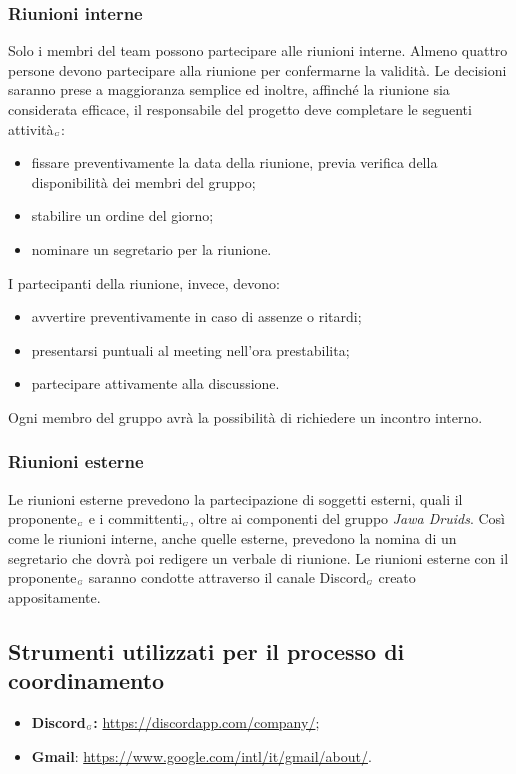 \subsubsection{Riunioni interne}\label{ProcessiOrganizzativiProcessoDiCoordinamentoRiunioniRiunioniInterne}
Solo i membri del team possono partecipare alle riunioni interne. Almeno quattro persone devono partecipare alla riunione per confermarne la validità. Le decisioni saranno prese a maggioranza semplice ed inoltre, affinché la riunione sia considerata efficace, il responsabile del progetto deve completare le seguenti attività$_{\scaleto{G}{3pt}}$:
\begin{itemize}
\item fissare preventivamente la data della riunione, previa verifica della disponibilità dei membri del gruppo;
\item stabilire un ordine del giorno;
\item nominare un segretario per la riunione.
\end{itemize}
I partecipanti della riunione, invece, devono:
\begin{itemize}
	\item avvertire preventivamente in caso di assenze o ritardi;
	\item presentarsi puntuali al meeting nell'ora prestabilita;
	\item partecipare attivamente alla discussione.
\end{itemize}
Ogni membro del gruppo avrà la possibilità di richiedere un incontro interno.
\subsubsection{Riunioni esterne}\label{ProcessiOrganizzativiProcessoDiCoordinamentoRiunionRiunioniEsterne}
Le riunioni esterne prevedono la partecipazione di soggetti esterni, quali il proponente$_{\scaleto{G}{3pt}}$ e i committenti$_{\scaleto{G}{3pt}}$, oltre ai componenti del gruppo \textit{Jawa Druids}.
Così come le riunioni interne, anche quelle esterne, prevedono la nomina di un segretario che dovrà poi redigere un verbale di riunione.
Le riunioni esterne con il proponente$_{\scaleto{G}{3pt}}$ saranno condotte attraverso il canale Discord$_{\scaleto{G}{3pt}}$ creato appositamente.
\subsection{Strumenti utilizzati per il processo di coordinamento}\label{ProcessiOrganizzativiProcessoDiCoordinamentoStrumentiUtilizzatiPerIlProcessoDiCoordinamento}
\begin{itemize}
	\item \textbf{Discord$_{\scaleto{G}{3pt}}$:} \url{https://discordapp.com/company/};
	\item \textbf{Gmail}: \url{https://www.google.com/intl/it/gmail/about/}.
\end{itemize}
